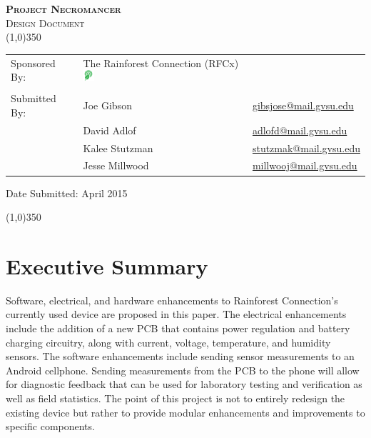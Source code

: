 \documentclass{article}
\newcommand{\ASSNMT}{Project Necromancer}
\newcommand{\CLASS}{Design Document}
\newcommand{\DATE}{April 2015}
\numberwithin{figure}{section}
\numberwithin{equation}{section}
\begin{document}
\begin{flushleft}

\textsc{\LARGE \bfseries \ASSNMT}\\

\textsc{\Large \CLASS}\\[0.2cm]
\linethickness{0.5mm}
{\color{ForestGreen}\line(1,0){350}} \\ [1.0cm]

\begin{flushleft} \large
\begin{tabular}{lll}
  Sponsored By: & The Rainforest Connection (RFCx) \includegraphics[height=0.4cm]{rfcxlogo} & \\
                &               & \\
  Submitted By: & Joe Gibson    & \href{mailto:gibsjose@mail.gvsu.edu}{gibsjose@mail.gvsu.edu}\\
              & David Adlof     & \href{mailto:adlofd@mail.gvsu.edu}{adlofd@mail.gvsu.edu}\\
              & Kalee Stutzman  & \href{mailto:stutzmak@mail.gvsu.edu}{stutzmak@mail.gvsu.edu}\\
              & Jesse Millwood  & \href{mailto:millwooj@mail.gvsu.edu}{millwooj@mail.gvsu.edu}\\
\end{tabular}

\bigskip

\bigskip
Date Submitted: \DATE
\end{flushleft}

\smallskip
{\color{ForestGreen}\line(1,0){350}} \\ [1.0cm]
\section*{Executive Summary} \label{sect:execsum}
Software, electrical, and hardware enhancements to Rainforest Connection’s currently used device are proposed in this paper. The electrical enhancements include the addition of a new PCB that contains power regulation and battery charging circuitry, along with current, voltage, temperature, and humidity sensors. The software enhancements include sending sensor measurements to an Android cellphone. Sending measurements from the PCB to the phone will allow for diagnostic feedback that can be used for laboratory testing and verification as well as field statistics. The point of this project is not to entirely redesign the existing device but rather to provide modular enhancements and improvements to specific components.


\end{flushleft}
\end{document}
